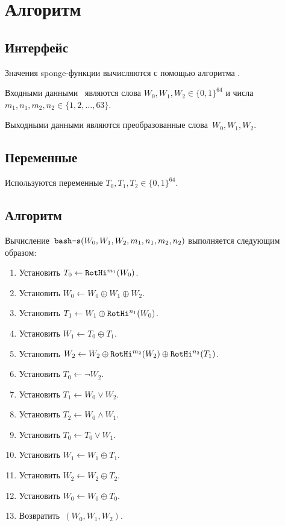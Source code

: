 \section{Алгоритм }\label{S}

\subsection{Интерфейс}\label{S.IFace}

Значения sponge-функции вычисляются с помощью алгоритма .

Входными данными~
являются слова $W_0,W_1,W_2\in\{0,1\}^{64}$
и числа~$m_1,n_1,m_2,n_2\in\{1,2,\ldots,63\}$.

Выходными данными являются преобразованные слова~$W_0,W_1,W_2$.

\subsection{Переменные}\label{S.Vars}

Используются переменные $T_0,T_1,T_2\in\{0,1\}^{64}$.

\subsection{Алгоритм}\label{S.Alg}

Вычисление~$\texttt{bash-s}(W_0,W_1,W_2,m_1,n_1,m_2,n_2)$ выполняется 
следующим образом:
\begin{enumerate}
\item
Установить
$T_0\leftarrow \mathop{\texttt{RotHi}}\nolimits^{m_1}(W_0)$.

\item
Установить
$W_0\leftarrow W_0\oplus W_1\oplus W_2$.

\item
Установить
$T_1\leftarrow W_1\oplus \mathop{\texttt{RotHi}}\nolimits^{n_1}(W_0)$.

\item
Установить
$W_1\leftarrow T_0\oplus T_1$.

\item
Установить
$W_2\leftarrow W_2\oplus\mathop{\texttt{RotHi}}\nolimits^{m_2}(W_2)\oplus\mathop{\texttt{RotHi}}\nolimits^{n_2}(T_1)$.

\item
Установить
$T_0\leftarrow \neg W_2$.

\item
Установить
$T_1\leftarrow W_0\vee W_2$.

\item
Установить
$T_2\leftarrow W_0\wedge W_1$.

\item
Установить
$T_0\leftarrow T_0\vee W_1$.

\item
Установить
$W_1\leftarrow W_1\oplus T_1$.

\item
Установить
$W_2\leftarrow W_2\oplus T_2$.

\item
Установить
$W_0\leftarrow W_0\oplus T_0$.

\item
Возвратить~$(W_0,W_1,W_2)$.
\end{enumerate}
